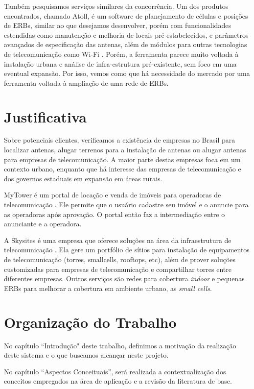 \documentclass[]{politex}
\begin{document}
Também pesquisamos serviços similares da concorrência. Um dos
produtos encontrados, chamado Atoll, é um software de planejamento de células e
posições de ERBs, similar ao que desejamos desenvolver, porém com 
funcionalidades estendidas como manutenção e melhoria de locais 
pré-estabelecidos, e parâmetros avançados de especificação das antenas, além de
módulos para outras tecnologias de telecomunicação como Wi-Fi \cite{atoll}.
Porém, a ferramenta parece muito voltada à instalação urbana e análise de
infra-estrutura pré-existente, sem foco em uma eventual expansão. Por isso,
vemos como que há necessidade do mercado por uma ferramenta voltada à ampliação
de uma rede de ERBs.

\section{Justificativa}
Sobre potenciais clientes, verificamos a existência de empresas no Brasil para
localizar antenas, alugar terrenos para a instalação de antenas ou alugar
antenas para empresas de telecomunicação. A maior parte destas empresas foca em
um contexto urbano, enquanto que há interesse das empresas de telecomunicação
e dos governos estaduais em expansão em áreas rurais.

MyTower é um portal de locação e venda de imóveis para operadoras de
telecomunicação \cite{mytower}. Ele permite que o usuário cadastre seu imóvel
e o anuncie para as operadoras após aprovação.
O portal então faz a intermediação entre o anunciante e a operadora.

A Skysites é uma empresa que oferece soluções na área da infraestrutura de
telecomunicação \cite{skysites}. Ela gere um portfólio de sítios para 
instalação de equipamentos de telecomunicação (torres, smallcells, rooftops,
etc), além de prover soluções customizadas para empresas de telecomunicação e 
compartilhar torres entre diferentes empresas. Outros serviços são redes para
cobertura \textit{indoor} e pequenas ERBs para melhorar a cobertura em ambiente
urbano, as \textit{small cells}.

\section{Organização do Trabalho}
No capítulo ``Introdução" deste trabalho, definimos a motivação da realização
deste sistema e o que buscamos alcançar neste projeto.

No capítulo ``Aspectos Conceituais'', será realizada a contextualização dos
conceitos empregados na área de aplicação e a revisão da literatura de base.
\end{document}
